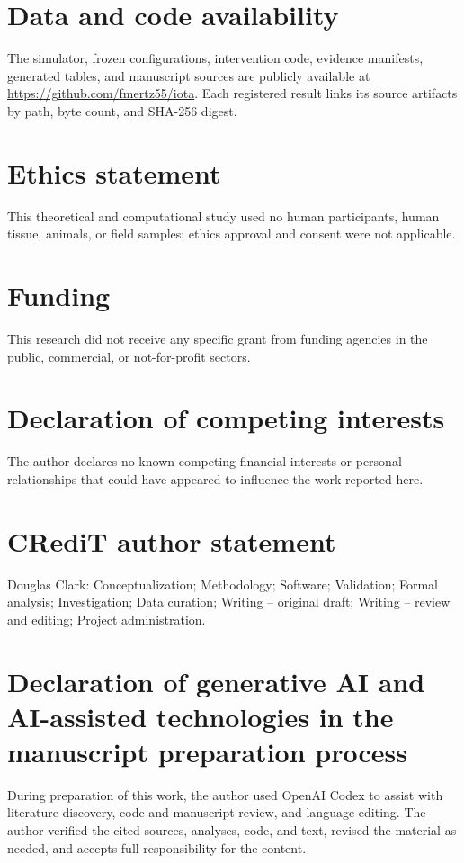 \documentclass[11pt]{article}
\begin{document}
\section*{Data and code availability}
The simulator, frozen configurations, intervention code, evidence manifests,
generated tables, and manuscript sources are publicly available at
\url{https://github.com/fmertz55/iota}. Each registered result links its source
artifacts by path, byte count, and SHA-256 digest.

\section*{Ethics statement}
This theoretical and computational study used no human participants, human
tissue, animals, or field samples; ethics approval and consent were not
applicable.

\section*{Funding}
This research did not receive any specific grant from funding agencies in the
public, commercial, or not-for-profit sectors.

\section*{Declaration of competing interests}
The author declares no known competing financial interests or personal
relationships that could have appeared to influence the work reported here.

\section*{CRediT author statement}
Douglas Clark: Conceptualization; Methodology; Software; Validation; Formal
analysis; Investigation; Data curation; Writing -- original draft; Writing --
review and editing; Project administration.

\section*{Declaration of generative AI and AI-assisted technologies in the manuscript preparation process}
During preparation of this work, the author used OpenAI Codex to assist with
literature discovery, code and manuscript review, and language editing. The
author verified the cited sources, analyses, code, and text, revised the
material as needed, and accepts full responsibility for the content.



\end{document}
